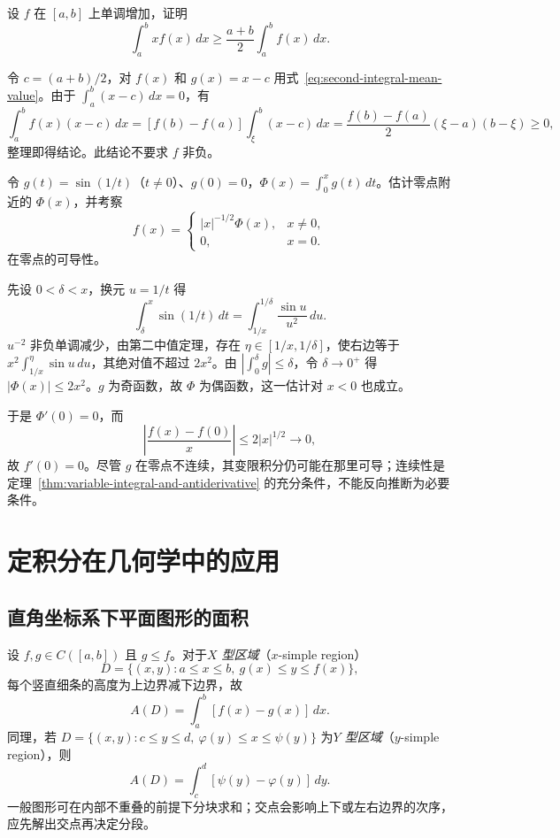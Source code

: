 \documentclass[UTF8,12pt,a4paper,fontset=fandol]{ctexbook}
\begin{document}
\begin{example}
\label{ex:monotone-weighted-first-moment}
设 $f$ 在 $[a,b]$ 上单调增加，证明
\[
    \int_a^bxf(x)\,dx\geq\frac{a+b}{2}\int_a^bf(x)\,dx.
\]
\end{example}
\begin{solve}
令 $c=(a+b)/2$，对 $f(x)$ 和 $g(x)=x-c$ 用式~\eqref{eq:second-integral-mean-value}。由于 $\int_a^b(x-c)\,dx=0$，有
\[
    \int_a^bf(x)(x-c)\,dx
    =[f(b)-f(a)]\int_\xi^b(x-c)\,dx
    =\frac{f(b)-f(a)}2(\xi-a)(b-\xi)\geq0,
\]
整理即得结论。此结论不要求 $f$ 非负。
\end{solve}

\begin{example}
\label{ex:oscillatory-integral-at-zero}
令 $g(t)=\sin(1/t)$（$t\neq0$）、$g(0)=0$，$\Phi(x)=\int_0^xg(t)\,dt$。估计零点附近的 $\Phi(x)$，并考察
\[
    f(x)=
    \begin{cases}|x|^{-1/2}\Phi(x),&x\neq0,\\0,&x=0.\end{cases}
\]
在零点的可导性。
\end{example}
\begin{solve}
先设 $0<\delta<x$，换元 $u=1/t$ 得
\[
    \int_\delta^x\sin(1/t)\,dt
    =\int_{1/x}^{1/\delta}\frac{\sin u}{u^2}\,du.
\]
$u^{-2}$ 非负单调减少，由第二中值定理，存在 $\eta\in[1/x,1/\delta]$，使右边等于 $x^2\int_{1/x}^{\eta}\sin u\,du$，其绝对值不超过 $2x^2$。由 $|\int_0^\delta g|\leq\delta$，令 $\delta\to0^+$ 得 $|\Phi(x)|\leq2x^2$。$g$ 为奇函数，故 $\Phi$ 为偶函数，这一估计对 $x<0$ 也成立。

于是 $\Phi'(0)=0$，而
\[
    \left|\frac{f(x)-f(0)}x\right|
    \leq2|x|^{1/2}\longrightarrow0,
\]
故 $f'(0)=0$。尽管 $g$ 在零点不连续，其变限积分仍可能在那里可导；连续性是定理~\ref{thm:variable-integral-and-antiderivative} 的充分条件，不能反向推断为必要条件。
\end{solve}

\section{定积分在几何学中的应用}
\label{sec:geometric-applications-of-definite-integrals}

\subsection{直角坐标系下平面图形的面积}
\label{subsec:plane-areas-in-cartesian-coordinates}

设 $f,g\in C([a,b])$ 且 $g\leq f$。对于\emph{$X$ 型区域}（$x$-simple region）
\[
    D=\{(x,y):a\leq x\leq b,\ g(x)\leq y\leq f(x)\},
\]
每个竖直细条的高度为上边界减下边界，故
\begin{equation}
    A(D)=\int_a^b[f(x)-g(x)]\,dx.
    \label{eq:cartesian-area-x-simple}
\end{equation}
同理，若 $D=\{(x,y):c\leq y\leq d,\ \varphi(y)\leq x\leq\psi(y)\}$ 为\emph{$Y$ 型区域}（$y$-simple region），则
\[
    A(D)=\int_c^d[\psi(y)-\varphi(y)]\,dy.
\]
一般图形可在内部不重叠的前提下分块求和；交点会影响上下或左右边界的次序，应先解出交点再决定分段。
\end{document}
